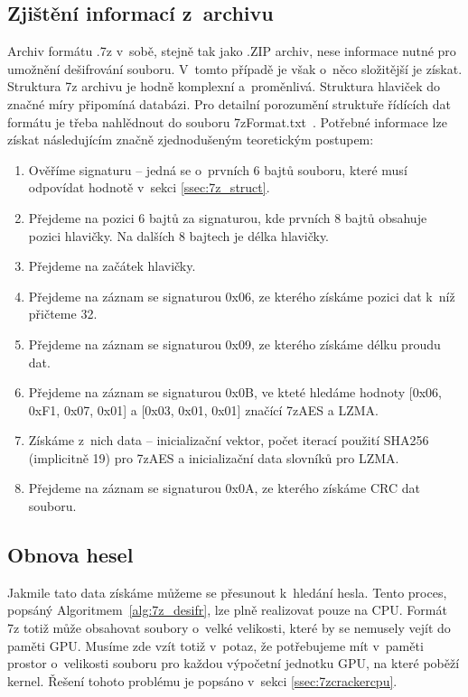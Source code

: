 \subsection{Zjištění informací z~archivu}
Archiv formátu .7z v~sobě, stejně tak jako .ZIP archiv, nese informace nutné pro umožnění
dešifrování souboru. V~tomto případě je však o~něco složitější je získat. Struktura 7z archivu
je hodně komplexní a~proměnlivá. Struktura hlaviček do značné míry připomíná databázi. Pro
detailní porozumění struktuře řídících dat formátu je třeba nahlědnout do souboru
7zFormat.txt~\cite{Pavlov:2010}. Potřebné informace lze získat následujícím značně zjednodušeným
teoretickým postupem:
\begin{enumerate}
    \item Ověříme signaturu -- jedná se o~prvních 6 bajtů souboru, které musí odpovídat hodnotě
v~sekci \ref{ssec:7z_struct}. 
    \item Přejdeme na pozici 6 bajtů za signaturou, kde	prvních 8 bajtů obsahuje pozici hlavičky.
	Na dalších 8 bajtech je délka hlavičky.
    \item Přejdeme na začátek hlavičky.
    \item Přejdeme na záznam se signaturou 0x06, ze kterého získáme pozici dat k~níž přičteme 32.
    \item Přejdeme na záznam se signaturou 0x09, ze kterého získáme délku proudu dat.
    \item Přejdeme na záznam se signaturou 0x0B, ve kteté hledáme hodnoty [0x06, 0xF1, 0x07, 0x01]
	a [0x03, 0x01, 0x01] značící 7zAES a LZMA.
    \item Získáme z~nich data -- inicializační vektor, počet iterací použití SHA256 (implicitně
	19) pro 7zAES a inicializační data slovníků pro LZMA.
    \item Přejdeme na záznam se signaturou 0x0A, ze kterého získáme CRC dat souboru.
\end{enumerate}

\subsection{Obnova hesel}
Jakmile tato data získáme můžeme se přesunout k~hledání hesla. Tento proces, popsáný
Algoritmem~\ref{alg:7z_desifr}, lze plně realizovat pouze na CPU. Formát 7z totiž může obsahovat
soubory o~velké velikosti, které by se nemusely vejít do paměti GPU. Musíme zde vzít totiž
v~potaz, že potřebujeme mít v~paměti prostor o~velikosti souboru pro každou výpočetní jednotku GPU,
na které poběží kernel. Řešení tohoto problému je popsáno v~sekci \ref{ssec:7zcrackercpu}.

